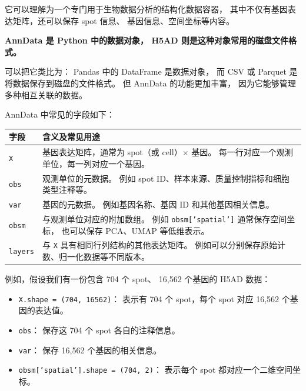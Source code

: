 \documentclass[UTF8,a4paper,11pt,fontset=fandol]{ctexart}
\newcommand{\code}[1]{{\color{tealaccent}\texttt{#1}}}
\begin{document}
它可以理解为一个专门用于生物数据分析的结构化数据容器，
其中不仅有基因表达矩阵，还可以保存 spot 信息、
基因信息、空间坐标等内容。

\textbf{AnnData 是 Python 中的数据对象，
H5AD 则是这种对象常用的磁盘文件格式。}

可以把它类比为：
Pandas 中的 DataFrame 是数据对象，
而 CSV 或 Parquet 是将数据保存到磁盘的文件格式。
但 AnnData 的功能更加丰富，
因为它能够管理多种相互关联的数据。

AnnData 中常见的字段如下：

\begin{center}
\begin{tabularx}{\linewidth}{@{}l Y@{}}
\toprule
{}
字段 & 含义及常见用途 \\
\midrule
\code{X}
& 基因表达矩阵，通常为 spot（或 cell）$\times$ 基因。
每一行对应一个观测单位，每一列对应一个基因。 \\

\code{obs}
& 观测单位的元数据。
例如 spot ID、样本来源、质量控制指标和细胞类型注释等。 \\

\code{var}
& 基因的元数据。
例如基因名称、基因 ID 和其他基因相关信息。 \\

\code{obsm}
& 与观测单位对应的附加数组。
例如 \code{obsm['spatial']} 通常保存空间坐标，
也可以保存 PCA、UMAP 等低维表示。 \\

\code{layers}
& 与 \code{X} 具有相同行列结构的其他表达矩阵。
例如可以分别保存原始计数、归一化数据等不同版本。 \\
\bottomrule
\end{tabularx}
\end{center}

例如，假设我们有一份包含 704 个 spot、
16,562 个基因的 H5AD 数据：

\begin{itemize}
  \item \code{X.shape = (704, 16562)}：
  表示有 704 个 spot，每个 spot 对应 16,562 个基因的表达值。

  \item \code{obs}：
  保存这 704 个 spot 各自的注释信息。

  \item \code{var}：
  保存 16,562 个基因的相关信息。

  \item \code{obsm['spatial'].shape = (704, 2)}：
  表示每个 spot 都对应一个二维空间坐标。
\end{itemize}
\end{document}
